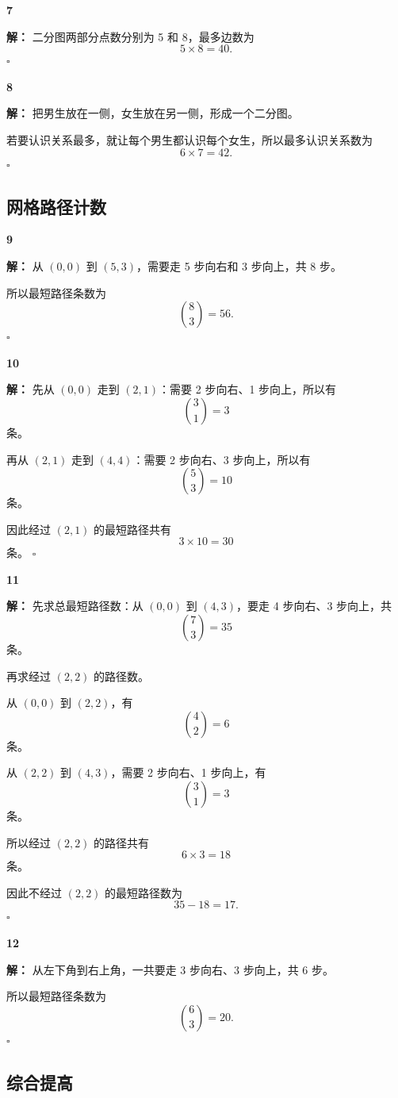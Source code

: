 \documentclass[11pt,a4paper,fontset=fandol]{ctexart}
\theoremstyle{formalexample}
\newenvironment{solution}{\par\noindent\textbf{解：}}{\hfill$\square$\par}
\begin{document}
\textbf{7}\begin{solution}
二分图两部分点数分别为 5 和 8，最多边数为
\[
5\times 8=40.
\]
\end{solution}

\textbf{8}\begin{solution}
把男生放在一侧，女生放在另一侧，形成一个二分图。

若要认识关系最多，就让每个男生都认识每个女生，所以最多认识关系数为
\[
6\times 7=42.
\]
\end{solution}

\subsection*{网格路径计数}

\textbf{9}\begin{solution}
从 $(0,0)$ 到 $(5,3)$，需要走 5 步向右和 3 步向上，共 8 步。

所以最短路径条数为
\[
\binom83=56.
\]
\end{solution}

\textbf{10}\begin{solution}
先从 $(0,0)$ 走到 $(2,1)$：需要 2 步向右、1 步向上，所以有
\[
\binom31=3
\]
条。

再从 $(2,1)$ 走到 $(4,4)$：需要 2 步向右、3 步向上，所以有
\[
\binom53=10
\]
条。

因此经过 $(2,1)$ 的最短路径共有
\[
3\times 10=30
\]
条。
\end{solution}

\textbf{11}\begin{solution}
先求总最短路径数：从 $(0,0)$ 到 $(4,3)$，要走 4 步向右、3 步向上，共
\[
\binom73=35
\]
条。

再求经过 $(2,2)$ 的路径数。

从 $(0,0)$ 到 $(2,2)$，有
\[
\binom42=6
\]
条。

从 $(2,2)$ 到 $(4,3)$，需要 2 步向右、1 步向上，有
\[
\binom31=3
\]
条。

所以经过 $(2,2)$ 的路径共有
\[
6\times 3=18
\]
条。

因此不经过 $(2,2)$ 的最短路径数为
\[
35-18=17.
\]
\end{solution}

\textbf{12}\begin{solution}
从左下角到右上角，一共要走 3 步向右、3 步向上，共 6 步。

所以最短路径条数为
\[
\binom63=20.
\]
\end{solution}

\subsection*{综合提高}
\end{document}
